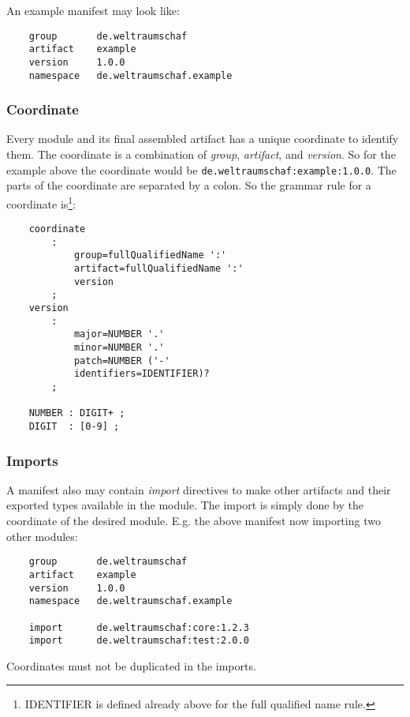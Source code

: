 \documentclass[a4paper,12pt]{article}
\begin{document}
An example manifest may look like:

\begin{verbatim}
    group       de.weltraumschaf
    artifact    example
    version     1.0.0
    namespace   de.weltraumschaf.example
\end{verbatim}

\subsubsection{Coordinate}

Every module and its final assembled artifact has a unique coordinate to identify them. The coordinate is a combination of \textit{group}, \textit{artifact}, and \textit{version}. So for the example above the coordinate would be \verb|de.weltraumschaf:example:1.0.0|. The parts of the coordinate are separated by a colon. So the grammar rule for a coordinate is\footnote{IDENTIFIER is defined already above for the full qualified name rule.}:

\begin{verbatim}
    coordinate 
        : 
            group=fullQualifiedName ':' 
            artifact=fullQualifiedName ':' 
            version
        ;
    version
        : 
            major=NUMBER '.' 
            minor=NUMBER '.' 
            patch=NUMBER ('-' 
            identifiers=IDENTIFIER)?
        ;
        
    NUMBER : DIGIT+ ;
    DIGIT  : [0-9] ;
\end{verbatim}

\subsubsection{Imports}

A manifest also may contain \textit{import} directives to make other artifacts and their exported types available in the module. The import is simply done by the coordinate of the desired module. E.g. the above manifest now importing two other modules:

\begin{verbatim}
    group       de.weltraumschaf
    artifact    example
    version     1.0.0
    namespace   de.weltraumschaf.example
    
    import      de.weltraumschaf:core:1.2.3
    import      de.weltraumschaf:test:2.0.0
\end{verbatim}

Coordinates must not be duplicated in the imports.
\end{document}
